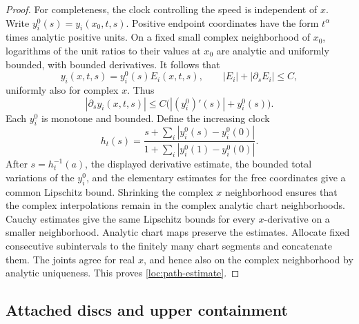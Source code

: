 \begin{proof}
For completeness, the clock controlling the speed is independent of
$x$.  Write $y_i^0(s)=y_i(x_0,t,s)$.  Positive endpoint coordinates have
the form $t^\alpha$ times analytic positive units.  On a fixed small
complex neighborhood of $x_0$, logarithms of the unit ratios to their
values at $x_0$ are analytic and uniformly bounded, with bounded
derivatives.  It follows that
\[
 y_i(x,t,s)=y_i^0(s)E_i(x,t,s),\qquad
 |E_i|+|\partial_s E_i|\leq C,
\]
uniformly also for complex $x$.  Thus
\[
 |\partial_s y_i(x,t,s)|
           \leq C\bigl(|(y_i^0)'(s)|+y_i^0(s)\bigr).
\]
Each $y_i^0$ is monotone and bounded.  Define the increasing clock
\[
 h_t(s)=
 \frac{s+\sum_i|y_i^0(s)-y_i^0(0)|}
 {1+\sum_i|y_i^0(1)-y_i^0(0)|}.
\]
After $s=h_t^{-1}(a)$, the displayed derivative estimate, the bounded
total variations of the $y_i^0$, and the elementary estimates for the
free coordinates give a common Lipschitz bound.  Shrinking the complex
$x$ neighborhood ensures that the complex interpolations remain in the
complex analytic chart neighborhoods.  Cauchy estimates give the same
Lipschitz bounds for every $x$-derivative on a smaller neighborhood.
Analytic chart maps preserve the estimates.  Allocate fixed consecutive
subintervals to the finitely many chart segments and concatenate them.
The joints agree for real $x$, and hence also on the complex
neighborhood by analytic uniqueness.  This proves
\eqref{loc:path-estimate}.
\end{proof}

\subsection{Attached discs and upper containment}

